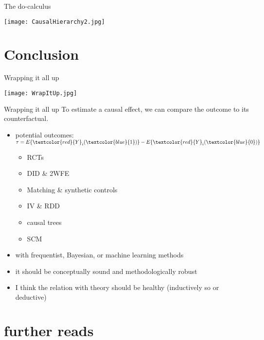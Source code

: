 \documentclass[aspectratio=169]{beamer}
\begin{document}
		\begin{frame}{The do-calculus}
			\begin{center}
				\texttt{[image: CausalHierarchy2.jpg]}
			\end{center}
		\end{frame}

\section{Conclusion}


	\begin{frame}{Wrapping it all up}
		\begin{center}
			\texttt{[image: WrapItUp.jpg]}
		\end{center}
	\end{frame}

	\begin{frame}{Wrapping it all up}
		To estimate a causal effect, we can compare the outcome to its counterfactual.
		\begin{itemize}
			\item<1-> potential outcomes: $ \tau  =  E \{\textcolor{red}{Y}_i(\textcolor{blue}{1})\} - E \{\textcolor{red}{Y}_i(\textcolor{blue}{0})\} $
			\begin{itemize}
				\item<2-> RCTs
				\item<2-> DID \& 2WFE
				\item<2-> Matching \& synthetic controls
				\item<2-> IV \& RDD
				\item<2-> causal trees
				\item<2->	SCM
			\end{itemize}
			\item<3-> with frequentist, Bayesian, or machine learning methods
			\item<4-> it should be conceptually sound and methodologically robust
			\item<5> I think the relation with theory should be healthy (inductively so or deductive)
		\end{itemize}
	\end{frame}

\section{further reads}
\end{document}
